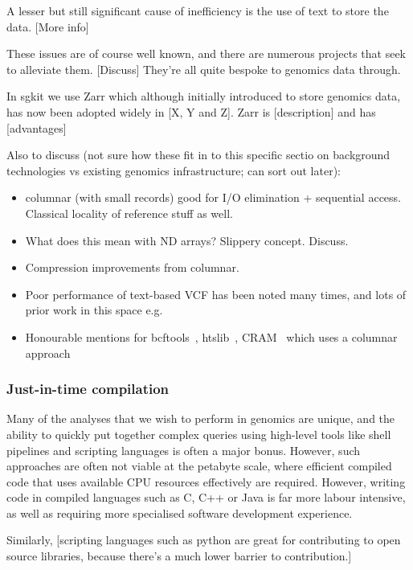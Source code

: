 \documentclass[a4paper,num-refs]{oup-contemporary}
\begin{document}
A lesser but still significant cause of inefficiency is the use of
text to store the data. [More info]

These issues are of course well known, and there are numerous projects
that seek to alleviate them. [Discuss] They're all quite bespoke to genomics data
through.

In sgkit we use Zarr which although initially introduced to store
genomics data, has now been adopted widely in [X, Y and Z].
Zarr is [description] and has [advantages]

Also to discuss (not sure how these fit in to this specific sectio
on background technologies vs existing genomics infrastructure; can
sort out later):

\begin{itemize}
\item columnar (with small records) good for I/O elimination + sequential access.
Classical locality of reference stuff as well.
\item What does this mean with ND arrays? Slippery concept. Discuss.
\item Compression improvements from columnar.
\item Poor performance of text-based VCF has been noted many times,
and lots of prior work in this space e.g. \citep{kelleher2013processing}
\item Honourable mentions for bcftools~\citep{danecek2021twelve},
htslib~\citep{bonfield2021htslib}, CRAM~\citep{bonfield2014scramble,bonfield2022cram}
which uses a columnar approach
\end{itemize}

\subsubsection{Just-in-time compilation}

Many of the analyses that we wish to perform in genomics are unique,
and the ability to quickly put together complex queries using
high-level tools like shell pipelines and scripting languages
is often a major bonus. However, such approaches are often not
viable at the petabyte scale, where efficient compiled code that
uses available CPU resources effectively are required. However,
writing code in compiled languages such as C, C++ or Java
is far more labour intensive, as well as requiring more specialised
software development experience.

Similarly, [scripting languages such as python are great for
contributing to open source libraries, because there's a much
lower barrier to contribution.]
\end{document}
